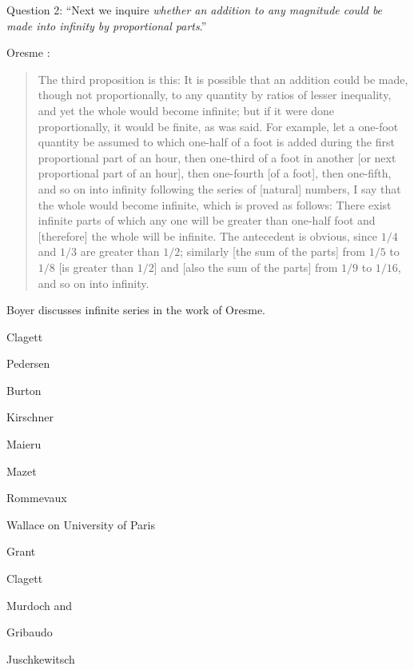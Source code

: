 \documentclass{amsart}
\theoremstyle{definition}
\begin{document}
Question 2: ``Next we inquire {\em whether an addition to any magnitude could be made into infinity by proportional parts}.''


Oresme \cite[p.~135]{grant1974}:
\begin{quote}
The third proposition is this: It is possible that an addition could be made, though not proportionally, to any quantity by ratios of lesser
inequality, and yet the whole would become infinite; but if it were done proportionally, it would be finite, as was said. For example, let a one-foot
quantity be assumed to which one-half of a foot is added during the first proportional part of an hour, then one-third of a foot in another [or next proportional
part of an hour], then one-fourth [of a foot], then one-fifth, and so on into infinity following the series of [natural] numbers, I say that the whole would become
infinite, which is proved as follows: There exist infinite parts of which any one will be greater than one-half foot and [therefore] the whole will be infinite. The antecedent is obvious, since
$1/4$ and $1/3$ are greater than $1/2$; similarly [the sum of the parts] from $1/5$ to $1/8$ [is greater than $1/2$] and [also the sum of the parts]
from $1/9$ to $1/16$, and so on into infinity.
\end{quote}



Boyer \cite[pp.~80--89]{boyer} discusses infinite series in the work of Oresme.

Clagett \cite{clagett1968}

Pedersen \cite[p.~199]{pedersen}

Burton \cite{burton}

Kirschner \cite{kirschner}

Maieru \cite{maieru}

Mazet \cite{mazet}

Rommevaux \cite{rommevaux}

Wallace \cite[pp.~65--116, Chapter 3]{wallace} on University of Paris

Grant \cite{proportionibus}

Clagett \cite{singleton}

Murdoch \cite{murdoch1975} and \cite{elkana}

Gribaudo \cite{gribaudo}

Juschkewitsch \cite[pp.~405--413]{juschkewitsch}



\end{document}

